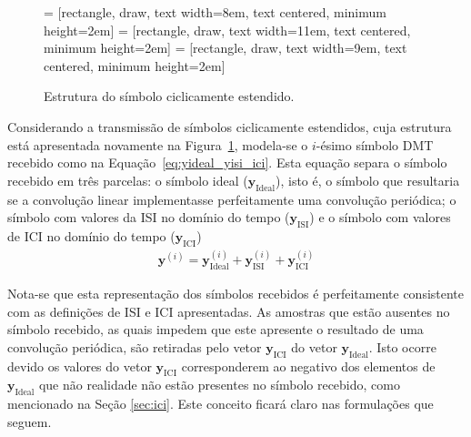 \begin{figure}[htbp]
\scriptsize
\centering
 = [rectangle, draw, text width=8em, text centered, minimum height=2em]
 = [rectangle, draw, text width=11em, text centered, minimum height=2em]
 = [rectangle, draw, text width=9em, text centered, minimum height=2em]
\caption{Estrutura do símbolo ciclicamente estendido.
\label{fig:structure_ce} }
\end{figure}

Considerando a transmissão de símbolos ciclicamente estendidos, cuja estrutura está apresentada novamente na Figura~\ref{fig:structure_ce}, modela-se o $i$-ésimo símbolo DMT recebido como na Equação~\ref{eq:yideal_yisi_ici}. Esta equação separa o símbolo recebido em três parcelas: o símbolo ideal ($\mathbf{y}_\text{Ideal}$), isto é, o símbolo que resultaria se a convolução linear implementasse perfeitamente uma convolução periódica; o símbolo com valores da ISI no domínio do tempo ($\mathbf{y}_\text{ISI}$) e o símbolo com valores de ICI no domínio do tempo ($\mathbf{y}_\text{ICI}$)
\begin{align}
\mathbf{y}^{(i)}= \mathbf{y}_\text{Ideal}^{(i)} + \mathbf{y}_\text{ISI}^{(i)} + \mathbf{y}_\text{ICI}^{(i)} 
\label{eq:yideal_yisi_ici}
\end{align}

Nota-se que esta representação dos símbolos recebidos é perfeitamente consistente com as definições de ISI e ICI apresentadas. As amostras que estão ausentes no símbolo recebido, as quais impedem que este apresente o resultado de uma convolução periódica, são retiradas pelo vetor $\mathbf{y}_\text{ICI}$ do vetor $\mathbf{y}_\text{Ideal}$. Isto ocorre devido os valores do vetor $\mathbf{y}_\text{ICI}$ corresponderem ao negativo dos elementos de $\mathbf{y}_\text{Ideal}$ que não realidade não estão presentes no símbolo recebido, como mencionado na Seção \ref{sec:ici}. Este conceito ficará claro nas formulações que seguem.

